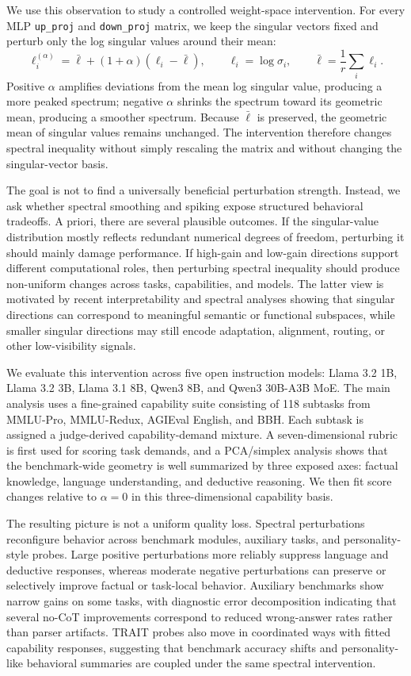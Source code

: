 We use this observation to study a controlled weight-space intervention. For every MLP \texttt{up\_proj} and \texttt{down\_proj} matrix, we keep the singular vectors fixed and perturb only the log singular values around their mean:
\[
\ell_i^{(\alpha)}=\bar{\ell}+(1+\alpha)(\ell_i-\bar{\ell}),
\qquad
\ell_i=\log\sigma_i,\qquad
\bar{\ell}=\frac{1}{r}\sum_i \ell_i .
\]
Positive \(\alpha\) amplifies deviations from the mean log singular value, producing a more peaked spectrum; negative \(\alpha\) shrinks the spectrum toward its geometric mean, producing a smoother spectrum. Because \(\bar{\ell}\) is preserved, the geometric mean of singular values remains unchanged. The intervention therefore changes spectral inequality without simply rescaling the matrix and without changing the singular-vector basis.

The goal is not to find a universally beneficial perturbation strength. Instead, we ask whether spectral smoothing and spiking expose structured behavioral tradeoffs. A priori, there are several plausible outcomes. If the singular-value distribution mostly reflects redundant numerical degrees of freedom, perturbing it should mainly damage performance. If high-gain and low-gain directions support different computational roles, then perturbing spectral inequality should produce non-uniform changes across tasks, capabilities, and models. The latter view is motivated by recent interpretability and spectral analyses showing that singular directions can correspond to meaningful semantic or functional subspaces, while smaller singular directions may still encode adaptation, alignment, routing, or other low-visibility signals.

We evaluate this intervention across five open instruction models: Llama 3.2 1B, Llama 3.2 3B, Llama 3.1 8B, Qwen3 8B, and Qwen3 30B-A3B MoE. The main analysis uses a fine-grained capability suite consisting of 118 subtasks from MMLU-Pro, MMLU-Redux, AGIEval English, and BBH. Each subtask is assigned a judge-derived capability-demand mixture. A seven-dimensional rubric is first used for scoring task demands, and a PCA/simplex analysis shows that the benchmark-wide geometry is well summarized by three exposed axes: factual knowledge, language understanding, and deductive reasoning. We then fit score changes relative to \(\alpha=0\) in this three-dimensional capability basis.

The resulting picture is not a uniform quality loss. Spectral perturbations reconfigure behavior across benchmark modules, auxiliary tasks, and personality-style probes. Large positive perturbations more reliably suppress language and deductive responses, whereas moderate negative perturbations can preserve or selectively improve factual or task-local behavior. Auxiliary benchmarks show narrow gains on some tasks, with diagnostic error decomposition indicating that several no-CoT improvements correspond to reduced wrong-answer rates rather than parser artifacts. TRAIT probes also move in coordinated ways with fitted capability responses, suggesting that benchmark accuracy shifts and personality-like behavioral summaries are coupled under the same spectral intervention.

